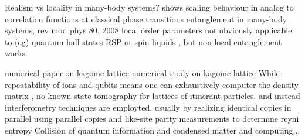 	Realism vs locality in many-body systems?
		\cite{Osborne02}%
		\cite{Osterloh02}%
			shows scaling behaviour in analog to correlation functions at classical phase transitions
		\cite{Amico08} entanglement in many-body systems, rev mod phys 80, 2008
	local order parameters not obviously applicable to (eg) quantum hall states RSP 
		\cite{Jiang12}%
	or spin liquids , but non-local entanglement works.
	
		\cite{Isakov11}%
			numerical paper on kagome lattice
		\cite{Jiang12}%
			numerical study on kagome lattice
	While repeatability of ions and qubits means one can exhaustively computer the density matrix , 
		\cite{Neill16}%
	no known state tomography for lattices of itinerant particles, 
	and instead interferometry techniques are employted, usually by realizing identical copies in parallel
		\cite{Brydges19}%
		\cite{Daley12}%
			using parallel copies and like-site parity measurements to determine reyni entropy
		\cite{Mouraalves04}%
		\cite{Palmer05}%
	Collision of quantum information and condensed matter and computing...
		\cite{Bakr11}%
		\cite{Rodriguez-briones17}%
		\cite{Boyin02}%


